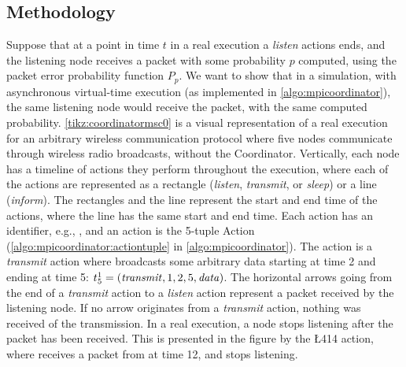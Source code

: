 \subsection{Methodology}\label{sec:correctnessmethods}
Suppose that at a point in time $t$ in a real execution a \textit{listen} actions ends, and the listening node
receives a packet with some probability $p$ computed, using the packet error probability function $P_p$. We
want to show that in a simulation, with asynchronous virtual-time execution (as implemented in
\autoref{algo:mpicoordinator}), the same listening node would receive the packet, with the same computed
probability. \autoref{tikz:coordinatormsc0} is a visual representation of a real execution for an
arbitrary wireless communication protocol where five nodes communicate through wireless radio broadcasts,
without the Coordinator. Vertically, each node has a timeline of actions they perform throughout the
execution, where each of the actions are represented as a rectangle (\textit{listen}, \textit{transmit}, or
\textit{sleep}) or a line (\textit{inform}). The rectangles and the line represent the start and end time of
the actions, where the line has the same start and end time. Each action has an identifier, e.g., ,
and an action is the 5-tuple Action (\autoref{algo:mpicoordinator:actiontuple} in
\autoref{algo:mpicoordinator}). The  action is a \textit{transmit} action where  broadcasts
some arbitrary data starting at time 2 and ending at time 5: $t^{1}_{5} = (\mathit{transmit}, 1, 2, 5,
\mathit{data})$. The horizontal arrows going from the end of a \textit{transmit} action to a \textit{listen}
action represent a packet received by the listening node. If no arrow originates from a \textit{transmit}
action, nothing was received of the transmission. In a real execution, a node stops listening after the packet
has been received. This is presented in the figure by the \L{4}{14} action, where  receives a packet
from  at time 12, and stops listening.
\medbreak

